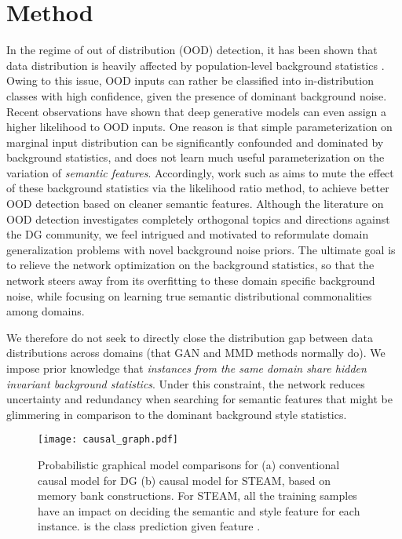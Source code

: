 \documentclass[10pt,twocolumn,letterpaper]{article}
\newcommand{\0}{{\bf 0}}
\begin{document}
\section{Method}
In the regime of out of distribution (OOD) detection, it has been shown that data distribution is heavily affected by population-level background statistics \cite{choi2018generative,nalisnick2018deep,ren2019likelihood,serra2019input}. Owing to this issue, OOD inputs can rather be classified into in-distribution classes with high confidence, given the presence of dominant background noise. Recent observations \cite{choi2018generative,nalisnick2018deep} have shown that deep generative models can even assign a higher likelihood to OOD inputs. One reason is that simple parameterization on marginal input distribution can be significantly confounded and dominated by background statistics, and does not learn much useful parameterization on the variation of {\emph{semantic features}}. Accordingly, work such as \cite{ren2019likelihood} aims to mute the effect of these background statistics via the likelihood ratio method, to achieve better OOD detection based on cleaner semantic features. Although the literature on OOD detection investigates completely orthogonal topics and directions against the DG community, we feel intrigued and motivated to reformulate domain generalization problems with novel background noise priors. The ultimate goal is to relieve the network optimization on the background statistics, so that the network steers away from its overfitting to these domain specific background noise, while focusing on learning true semantic distributional commonalities among domains.

We therefore do not seek to directly close the distribution gap between data distributions across domains (that GAN and MMD methods normally do). We impose prior knowledge that {\emph{ instances from the same domain share hidden invariant background statistics}}. Under this constraint, the network reduces uncertainty and redundancy when searching for semantic features that might be glimmering in comparison to the dominant background style statistics.

\begin{figure}[t]
\center
\texttt{[image: causal\_graph.pdf]}
\caption{Probabilistic graphical model comparisons for (a) conventional causal model for DG (b) causal model for STEAM, based on memory bank constructions. For STEAM, all the training samples have an impact on deciding the semantic and style feature for each instance.  is the class prediction given feature .}
\label{fig:causal_graph}
\end{figure}
\end{document}
